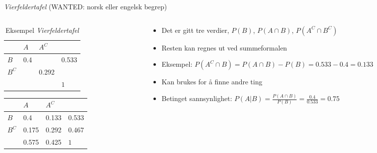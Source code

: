 \begin{frame}{\textit{Vierfeldertafel} (WANTED: norsk eller engelsk begrep)}
\begin{columns}
 \begin{column}{0.38\textwidth}
\begin{table}[h!]
\centering
\caption{Eksempel \textit{Vierfeldertafel}}
\label{tab:fourfold_eksempel1}
\begin{tabular}{l|ll|l}
\cline{2-3}
                            & $A$            & $A^C$            &                               \\ \hline
\multicolumn{1}{|l|}{$B$}   & 0.4   &     & \multicolumn{1}{l|}{0.533}   \\
\multicolumn{1}{|l|}{$B^C$} &   & 0.292 & \multicolumn{1}{l|}{} \\ \hline
                            &          &          & \multicolumn{1}{l|}{$1$}      \\ \cline{2-4} 
\end{tabular}
\end{table}

\begin{table}[h!]
\centering
\label{tab:fourfold_eksempel2}
\begin{tabular}{l|ll|l}
\cline{2-3}
                            & $A$            & $A^C$            &                               \\ \hline
\multicolumn{1}{|l|}{$B$}   & 0.4   & 0.133    & \multicolumn{1}{l|}{0.533}   \\
\multicolumn{1}{|l|}{$B^C$} & 0.175  & 0.292 & \multicolumn{1}{l|}{0.467} \\ \hline
                            & 0.575         & 0.425         & \multicolumn{1}{l|}{$1$}      \\ \cline{2-4} 
\end{tabular}
\end{table}
 \end{column}
 \begin{column}{0.58\textwidth}
\begin{itemize}
\item Det er gitt tre verdier, $P(B)$, $P(A\cap B)$, $P(A^C\cap B^C)$
\item Resten kan regnes ut ved summeformalen
\item Eksempel: $P(A^C\cap B)=P(A\cap B)-P(B)=0.533-0.4=0.133$
\item Kan brukes for å finne andre ting
\item Betinget sannsynlighet: $P(A|B)=\frac{P(A\cap B)}{P(B)}=\frac{0.4}{0.533}=0.75$
\end{itemize}
 \end{column}
\end{columns}
\end{frame}

